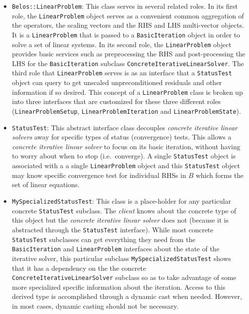 \documentclass[pdf,ps2pdf,11pt]{SANDreport}
\begin{document}
\begin{itemize}
\item{}\texttt{Belos::LinearProblem}:
This class serves in several related roles.  In its first role, the
{}\texttt{Linear\-Problem} object serves as a convenient common
aggregation of the operators, the scaling vectors and the RHS and LHS
multi-vector objects.  It is a {}\texttt{Linear\-Problem} that is
passed to a {}\texttt{Basic\-Iteration} object in order to solve a set
of linear systems.  In its second role, the {}\texttt{Linear\-Problem}
object provides basic services such as preprocessing the RHS and
post-processing the LHS for the {}\texttt{Basic\-Iteration} subclass
{}\texttt{Concrete\-Iterative\-Linear\-Solver}.  The third role that
{}\texttt{Linear\-Problem} serves is as an interface that a
{}\texttt{Status\-Test} object can query to get unscaled
unpreconditioned residuals and other information if so desired.  This
concept of a {}\texttt{Linear\-Problem} class is broken up into three
interfaces that are customized for these three different roles
({}\texttt{Linear\-Problem\-Setup},
{}\texttt{Linear\-Problem\-Iteration} and
{}\texttt{Linear\-Problem\-State}).

\item{}\texttt{StatusTest}:
This abstract interface class decouples {}\textit{concrete iterative
linear solvers} away for specific types of status (convergence) tests.
This allows a {}\textit{concrete iterative linear solver} to focus on
its basic iteration, without having to worry about when to stop
(i.e.~converge).  A single {}\texttt{Status\-Test} object is
associated with a a single {}\texttt{Linear\-Problem} object and this
{}\texttt{Status\-Test} object may know specific convergence test for
individual RHSs in $B$ which forms the set of linear equations.

\item{}\texttt{MySpecializedStatusTest}:
This class is a place-holder for any particular concrete
{}\texttt{Status\-Test} subclass.  The {}\textit{client} knows about
the concrete type of this object but the {}\textit{concrete iterative
linear solver} does not (because it is abstracted through the
{}\texttt{StatusTest} interface).  While most concrete
{}\texttt{StatusTest} subclasses can get everything they need from the
{}\texttt{Basic\-Iteration} and {}\texttt{Linear\-Problem} interfaces
about the state of the iterative solver, this particular subclass
{}\texttt{My\-Specialized\-Status\-Test} shows that it has a
dependency on the the concrete
{}\texttt{Concrete\-Iterative\-Linear\-Solver} subclass so as to take
advantage of some more specialized specific information about the
iteration.  Access to this derived type is accomplished through a
dynamic cast when needed.  However, in most cases, dynamic casting
should not be necessary.

\end{itemize}
\end{document}
